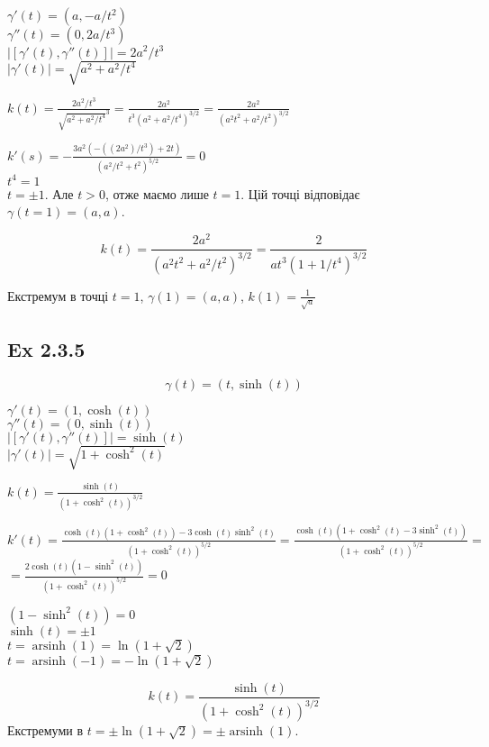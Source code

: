 \documentclass[10pt, a4paper]{article} %
\begin{document}
$\gamma'(t) = (a, -a/t^2)$\\
$\gamma''(t) = (0, 2a/t^3)$\\
$|[\gamma'(t), \gamma''(t)]| = 2a^2/t^3$\\
$|\gamma'(t)| = \sqrt{a^2+a^2/t^4}$

$k(t) = \frac{2a^2/t^3}{\sqrt{a^2+a^2/t^4}^3} = \frac{2a^2}{t^3(a^2+a^2/t^4)^{3/2}} = \frac{2a^2}{(a^2t^2+a^2/t^2)^{3/2}}$

$k'(s) = -\frac{3 a^2 (-((2 a^2)/t^3)+2 t)}{(a^2/t^2+t^2)^{5/2}} = 0 $\\
$t^4 = 1$\\
$t = \pm 1$. Але $t>0$, отже маємо лише $t=1$.
Цій точці відповідає $\gamma(t=1) = (a,a)$.

\begin{mdframed}[backgroundcolor=green!20]
    \[k(t) = \frac{2a^2}{(a^2t^2+a^2/t^2)^{3/2}} = \frac{2}{at^3(1+1/t^4)^{3/2}}\]

    Екстремум в точці $t=1$, $\gamma(1)=(a,a)$, $k(1) = \frac{1}{\sqrt{a}}$
\end{mdframed}


\subsection*{Ex 2.3.5}
\[\gamma(t) = (t, \sinh(t))\]

$\gamma'(t) = (1, \cosh(t))$\\
$\gamma''(t) = (0, \sinh(t))$\\
$|[\gamma'(t), \gamma''(t)]| = \sinh(t)$\\
$|\gamma'(t)| = \sqrt{1+\cosh^2(t)}$

$k(t) = \frac{\sinh(t)}{(1 + \cosh^2(t))^{3/2}}$

$k'(t) = \frac{\cosh(t)(1+\cosh^2(t))-3\cosh(t)\sinh^2(t)}{(1+\cosh^2(t))^{5/2}} 
= \frac{\cosh(t)(1+\cosh^2(t)-3\sinh^2(t))}{(1+\cosh^2(t))^{5/2}}=$
$= \frac{2\cosh(t)(1-\sinh^2(t))}{(1+\cosh^2(t))^{5/2}} = 0$

$(1-\sinh^2(t)) = 0$\\
$\sinh(t) = \pm 1$\\
$t = \operatorname{arsinh}(1) = \ln(1+\sqrt{2})$\\
$t = \operatorname{arsinh}(-1) = -\ln(1+\sqrt{2})$\\

\begin{mdframed}[backgroundcolor=green!20]
    \[k(t) = \frac{\sinh(t)}{(1 + \cosh^2(t))^{3/2}}\]
    Екстремуми в $t = \pm\ln(1+\sqrt{2}) = \pm\operatorname{arsinh}(1)$.
\end{mdframed}
\end{document}
